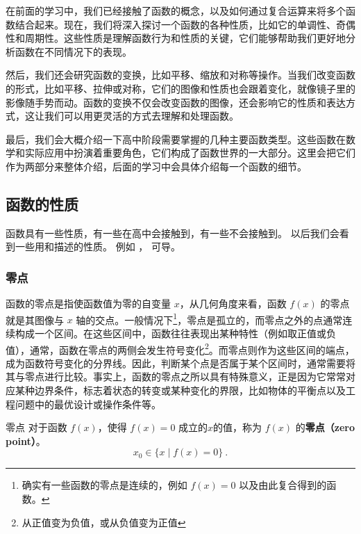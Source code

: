 
\begin{issues}
\issueDraft
\end{issues}


在前面的学习中，我们已经接触了函数的概念，以及如何通过复合运算来将多个函数结合起来。现在，我们将深入探讨一个函数的各种性质，比如它的单调性、奇偶性和周期性。这些性质是理解函数行为和性质的关键，它们能够帮助我们更好地分析函数在不同情况下的表现。

然后，我们还会研究函数的变换，比如平移、缩放和对称等操作。当我们改变函数的形式，比如平移、拉伸或对称，它们的图像和性质也会跟着变化，就像镜子里的影像随手势而动。函数的变换不仅会改变函数的图像，还会影响它的性质和表达方式，这让我们可以用更灵活的方式去理解和处理函数。

最后，我们会大概介绍一下高中阶段需要掌握的几种主要函数类型。这些函数在数学和实际应用中扮演着重要角色，它们构成了函数世界的一大部分。这里会把它们作为两部分来整体介绍，后面的学习中会具体介绍每一个函数的细节。


\subsection{函数的性质}\label{sub_HsFunC_1}

函数具有一些性质，有一些在高中会接触到，有一些不会接触到。
以后我们会看到一些用和描述的性质。 例如 %
， 可导。
\subsubsection{零点}

函数的零点是指使函数值为零的自变量 $x$，从几何角度来看，函数 $f(x)$ 的零点就是其图像与 $x$ 轴的交点。一般情况下\footnote{确实有一些函数的零点是连续的，例如 $f(x) = 0$ 以及由此复合得到的函数。}，零点是孤立的，而零点之外的点通常连续构成一个区间。在这些区间中，函数往往表现出某种特性（例如取正值或负值），通常，函数在零点的两侧会发生符号变化\footnote{从正值变为负值，或从负值变为正值}。而零点则作为这些区间的端点，成为函数符号变化的分界线。因此，判断某个点是否属于某个区间时，通常需要将其与零点进行比较。事实上，函数的零点之所以具有特殊意义，正是因为它常常对应某种边界条件，标志着状态的转变或某种变化的界限，比如物体的平衡点以及工程问题中的最优设计或操作条件等。

\begin{definition}{零点}
对于函数 $f(x)$，使得 $f(x) = 0$ 成立的$x$的值，称为 $f(x)$ 的\textbf{零点（zero point）}。
\begin{equation}
x_0 \in \{ x \mid f(x) = 0 \}~.
\end{equation}
\end{definition}

